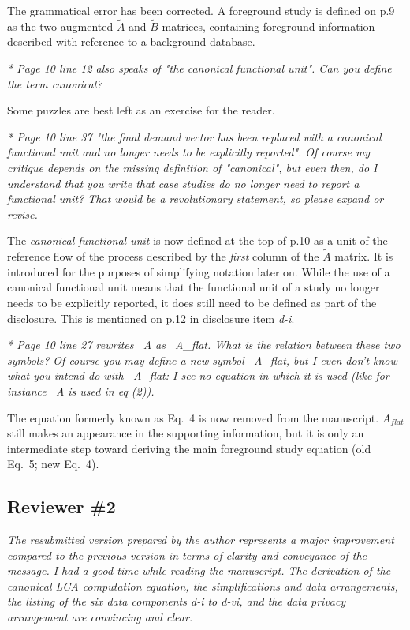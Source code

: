 \documentclass[11pt,letterpaper]{article}
\begin{document}
The grammatical error has been corrected.  A foreground study is defined on p.9 as the two augmented $\tilde{A}$ and $\tilde{B}$ matrices, containing foreground information described with reference to a background database.

\emph{* Page 10 line 12 also speaks of "the canonical functional unit". Can you define the term canonical?}

Some puzzles are best left as an exercise for the reader.

\emph{* Page 10 line 37 "the final demand vector has been replaced with a canonical functional unit and no longer needs to be explicitly reported". Of course my critique depends on the missing definition of "canonical", but even then, do I understand that you write that case studies do no longer need to report a functional unit? That would be a revolutionary statement, so please expand or revise. }

The \textit{canonical functional unit} is now defined at the top of p.10 as a unit of the reference flow of the process described by the \textit{first} column of the $\tilde{A}$ matrix. It is introduced for the purposes of simplifying notation later on.  While the use of a canonical functional unit means that the functional unit of a study no longer needs to be explicitly reported, it does still need to be defined as part of the disclosure. This is mentioned on p.12 in disclosure item \emph{d-i}.

\emph{  * Page 10 line 27 rewrites ~A as ~A\_flat. What is the relation between these two symbols? Of course you may define a new symbol ~A\_flat, but I even don't know what you intend do with ~A\_flat: I see no equation in which it is used (like for instance ~A is used in eq (2)).}

The equation formerly known as Eq.~4 is now removed from the manuscript.  $A_{flat}$ still makes an appearance in the supporting information, but it is only an intermediate step toward deriving the main foreground study equation (old Eq.~5; new Eq.~4).

\subsection*{Reviewer \#2}

\emph{The resubmitted version prepared by the author represents a major improvement compared to the previous version in terms of clarity and conveyance of the message. I had a good time while reading the manuscript.
  The derivation of the canonical LCA computation equation, the simplifications and data arrangements, the listing of the six data components d-i to d-vi, and the data privacy arrangement are convincing and clear.}
\end{document}
